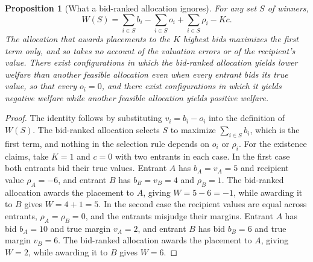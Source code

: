 \documentclass[11pt]{article}
\newtheorem{proposition}{Proposition}
\theoremstyle{definition}
\begin{document}
\begin{proposition}[What a bid-ranked allocation ignores]\label{prop:recipient}
For any set $S$ of winners,
\[
W(S)=\sum_{i\in S}b_i-\sum_{i\in S}o_i+\sum_{i\in S}\rho_i-Kc .
\]
The allocation that awards placements to the $K$ highest bids maximizes the first term only, and so takes no account of the valuation errors or of the recipient's value. There exist configurations in which the bid-ranked allocation yields lower welfare than another feasible allocation even when every entrant bids its true value, so that every $o_i=0$, and there exist configurations in which it yields negative welfare while another feasible allocation yields positive welfare.
\end{proposition}

\begin{proof}
The identity follows by substituting $v_i=b_i-o_i$ into the definition of $W(S)$. The bid-ranked allocation selects $S$ to maximize $\sum_{i\in S}b_i$, which is the first term, and nothing in the selection rule depends on $o_i$ or $\rho_i$. For the existence claims, take $K=1$ and $c=0$ with two entrants in each case. In the first case both entrants bid their true values. Entrant $A$ has $b_A=v_A=5$ and recipient value $\rho_A=-6$, and entrant $B$ has $b_B=v_B=4$ and $\rho_B=1$. The bid-ranked allocation awards the placement to $A$, giving $W=5-6=-1$, while awarding it to $B$ gives $W=4+1=5$. In the second case the recipient values are equal across entrants, $\rho_A=\rho_B=0$, and the entrants misjudge their margins. Entrant $A$ has bid $b_A=10$ and true margin $v_A=2$, and entrant $B$ has bid $b_B=6$ and true margin $v_B=6$. The bid-ranked allocation awards the placement to $A$, giving $W=2$, while awarding it to $B$ gives $W=6$.
\end{proof}
\end{document}
